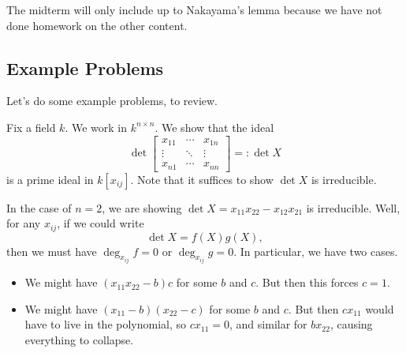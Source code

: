 \begin{remark}
	The midterm will only include up to Nakayama's lemma because we have not done homework on the other content.
\end{remark}

\subsection{Example Problems}
Let's do some example problems, to review.
\begin{exe} \label{exe:det}
	Fix a field $k$. We work in $k^{n\times n}$. We show that the ideal
	\[\det\begin{bmatrix}
		x_{11} & \cdots & x_{1n} \\
		\vdots & \ddots & \vdots \\
		x_{n1} & \cdots & x_{nn}
	\end{bmatrix}=:\det X\]
	is a prime ideal in $k[x_{ij}]$. Note that it suffices to show $\det X$ is irreducible.
\end{exe}
\begin{ex}
	In the case of $n=2$, we are showing $\det X=x_{11}x_{22}-x_{12}x_{21}$ is irreducible. Well, for any $x_{ij}$, if we could write
	\[\det X=f(X)g(X),\]
	then we must have $\deg_{x_{ij}}f=0$ or $\deg_{x_{ij}}g=0$. In particular, we have two cases.
	\begin{itemize}
		\item We might have $(x_{11}x_{22}-b)c$ for some $b$ and $c$. But then this forces $c=1$.
		\item We might have $(x_{11}-b)(x_{22}-c)$ for some $b$ and $c$. But then $cx_{11}$ would have to live in the polynomial, so $cx_{11}=0$, and similar for $bx_{22}$, causing everything to collapse.
	\end{itemize}
\end{ex}
